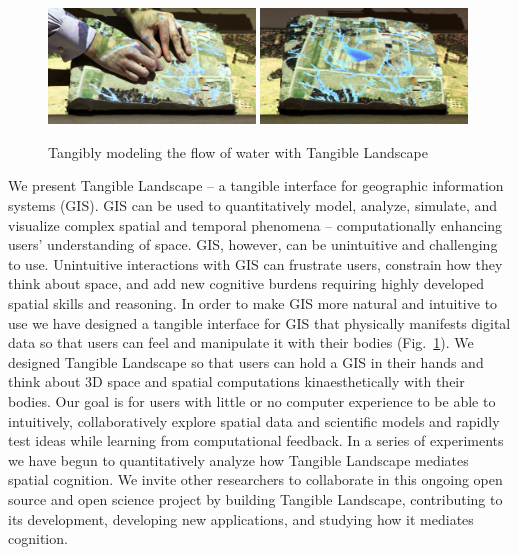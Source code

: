 \documentclass[prodmode,acmtochi]{acmsmall} %
\begin{document}
\begin{figure}[h!]
\begin{center}
		\includegraphics[width=0.49\textwidth]{images/tl_sequence_2.jpg}
		\includegraphics[width=0.49\textwidth]{images/tl_sequence_3.jpg}
	\caption{Tangibly modeling the flow of water with Tangible Landscape}
	\label{fig:tl_flow}
\end{center}
\end{figure}

We present Tangible Landscape -- 
a tangible interface for geographic information systems (GIS). 
%
GIS can be used to quantitatively model, analyze, simulate, and visualize 
complex spatial and temporal phenomena 
-- computationally enhancing users' understanding of space. 
%
GIS, however, can be unintuitive and challenging to use. 
%
Unintuitive interactions with GIS can 
frustrate users,
constrain how they think about space,
and add new cognitive burdens
requiring highly developed spatial skills and reasoning. 
%
In order to make GIS more natural and intuitive to use
we have designed a tangible interface for GIS
that physically manifests digital data 
so that users can feel and manipulate it with their bodies (Fig.~\ref{fig:tl_flow}). 
%
We designed Tangible Landscape
so that users can hold a GIS in their hands
and think about 
3D space and spatial computations %
kinaesthetically with their bodies.
%
Our goal is for users with little or no computer experience 
to be able to intuitively, collaboratively explore spatial data and scientific models and 
rapidly test ideas while learning from computational feedback. 
%
In a series of experiments we have begun to
quantitatively analyze how 
Tangible Landscape mediates spatial cognition. 
%
We invite other researchers to collaborate 
in this ongoing open source and open science project 
by building Tangible Landscape,
contributing to its development,
developing new applications, 
and studying how it mediates cognition. 
\end{document}
